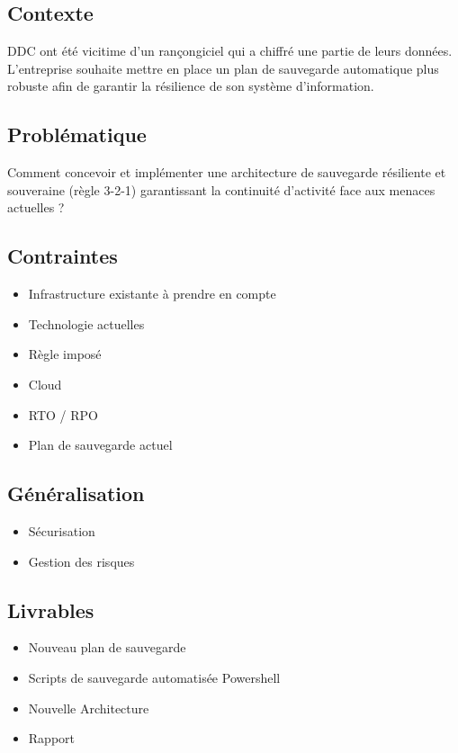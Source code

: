\subsection*{Contexte}
{}
\noindent DDC ont été vicitime d'un rançongiciel qui a chiffré une partie de leurs données. L'entreprise souhaite mettre en place un plan de sauvegarde automatique plus robuste afin de garantir la résilience de son système d'information.

\subsection*{Problématique}
{}
\noindent Comment concevoir et implémenter une architecture de sauvegarde résiliente et souveraine (règle 3-2-1) garantissant la continuité d'activité face aux menaces actuelles ?

\subsection*{Contraintes}
{}
\begin{itemize}
	\item Infrastructure existante à prendre en compte
	\item Technologie actuelles
	\item Règle imposé
	\item Cloud
	\item RTO / RPO
	\item Plan de sauvegarde actuel
\end{itemize}

\subsection*{Généralisation}
{}
\begin{itemize}
	\item Sécurisation
	\item Gestion des risques
\end{itemize}

\subsection*{Livrables}
{}
\begin{itemize}
	\item Nouveau plan de sauvegarde
	\item Scripts de sauvegarde automatisée Powershell
	\item Nouvelle Architecture
	\item Rapport
\end{itemize}

